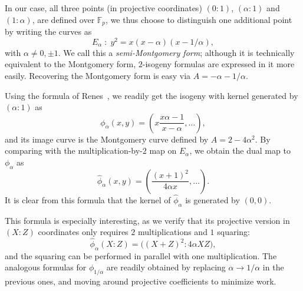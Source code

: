 \documentclass{llncs}
\newcommand{\F}{\mathbb{F}}
\begin{document}
In our case, all three points (in projective coordinates) $(0:1)$,
$(\alpha:1)$ and $(1:\alpha)$, are defined over $\F_p$, we thus choose
to distinguish one additional point by writing the curves as
\[E_\alpha \;:\; y^2 = x(x-\alpha)(x - 1/\alpha),\] %
with $\alpha\ne0,\pm 1$. %
We call this a \emph{semi-Montgomery form}; although it is technically
equivalent to the Montgomery form, $2$-isogeny formulas are expressed
in it more easily. %
Recovering the Montgomery form is easy via $A=-\alpha-1/\alpha$.

Using the formula of Renes~\cite{10.1007/978-3-319-79063-3_11}, we
readily get the isogeny with kernel generated by
$(\alpha:1)$ as
\begin{equation}
  \label{eq:isog-forward}
  \phi_\alpha(x,y) = \left(x\frac{x\alpha - 1}{x - \alpha}, \dots\right),
\end{equation}
and its image curve is the Montgomery curve defined by
$A = 2-4\alpha^2$. %
By comparing with the multiplication-by-$2$ map on $E_\alpha$, we
obtain the dual map to $\phi_\alpha$ as
\begin{equation}
  \label{eq:isog-backward}
  \hat\phi_\alpha(x,y) = \left(\frac{(x+1)^2}{4\alpha x}, \dots\right).
\end{equation}
It is clear from this formula that the kernel of $\hat\phi_\alpha$ is
generated by $(0,0)$.

This formula is especially interesting, as we verify that its
projective version in $(X:Z)$ coordinates only requires $2$
multiplications and $1$ squaring:
\begin{equation}
  \label{eq:isog-proj}
  \hat\phi_\alpha(X:Z) = \bigl((X+Z)^2 : 4\alpha XZ\bigr),
\end{equation}
and the squaring can be performed in parallel with one
multiplication. %
The analogous formulas for $\phi_{1/\alpha}$ are readily obtained by
replacing $\alpha\to 1/\alpha$ in the previous ones, and moving around
projective coefficients to minimize work.
\end{document}
